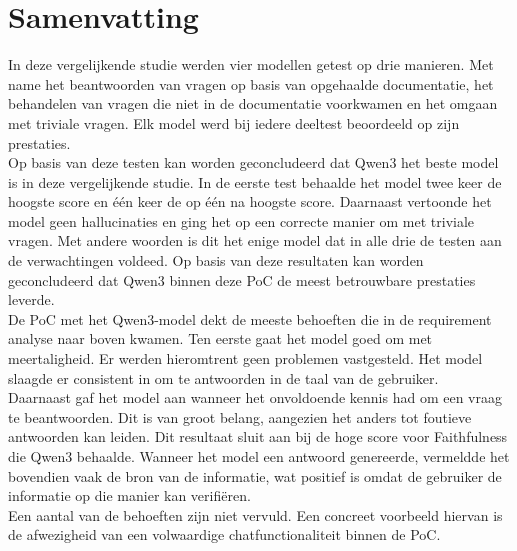 \section{Samenvatting}
In deze vergelijkende studie werden vier modellen getest op drie manieren. Met name het beantwoorden van vragen op basis van opgehaalde documentatie, het behandelen van vragen die niet in de documentatie voorkwamen en het omgaan met triviale vragen. Elk model werd bij iedere deeltest beoordeeld op zijn prestaties.
\\[1em]
Op basis van deze testen kan worden geconcludeerd dat Qwen3 het beste model is in deze vergelijkende studie. In de eerste test behaalde het model twee keer de hoogste score en één keer de op één na hoogste score. Daarnaast vertoonde het model geen hallucinaties en ging het op een correcte manier om met triviale vragen. Met andere woorden is dit het enige model dat in alle drie de testen aan de verwachtingen voldeed. Op basis van deze resultaten kan worden geconcludeerd dat Qwen3 binnen deze PoC de meest betrouwbare prestaties leverde.
\\[1em]
De PoC met het Qwen3-model dekt de meeste behoeften die in de requirement analyse naar boven kwamen. Ten eerste gaat het model goed om met meertaligheid. Er werden hieromtrent geen problemen vastgesteld. Het model slaagde er consistent in om te antwoorden in de taal van de gebruiker. 
\\[1em]
Daarnaast gaf het model aan wanneer het onvoldoende kennis had om een vraag te beantwoorden. Dit is van groot belang, aangezien het anders tot foutieve antwoorden kan leiden. Dit resultaat sluit aan bij de hoge score voor Faithfulness die Qwen3 behaalde. Wanneer het model een antwoord genereerde, vermeldde het bovendien vaak de bron van de informatie, wat positief is omdat de gebruiker de informatie op die manier kan verifiëren.  
\\[1em]
Een aantal van de behoeften zijn niet vervuld. Een concreet voorbeeld hiervan is de afwezigheid van een volwaardige chatfunctionaliteit binnen de PoC.